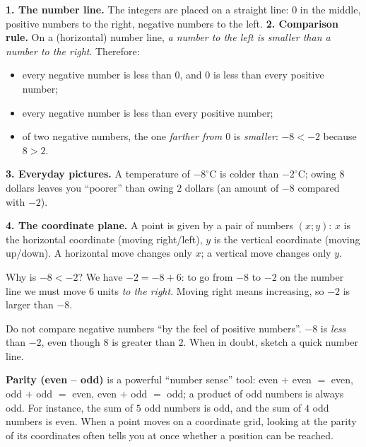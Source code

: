 \begin{knowbox}
\textbf{1. The number line.} The integers are placed on a straight line: $0$ in the middle, positive numbers to the
right, negative numbers to the left.
\textbf{2. Comparison rule.} On a (horizontal) number line, \emph{a number to the left is smaller than a number to the
right}. Therefore:
\begin{itemize}[leftmargin=1.4em,itemsep=1pt,topsep=2pt]
  \item every negative number is less than $0$, and $0$ is less than every positive number;
  \item every negative number is less than every positive number;
  \item of two negative numbers, the one \emph{farther from $0$} is \emph{smaller}: $-8 < -2$ because $8 > 2$.
\end{itemize}
\textbf{3. Everyday pictures.} A temperature of $-8^\circ$C is colder than $-2^\circ$C; owing $8$ dollars
leaves you ``poorer'' than owing $2$ dollars (an amount of $-8$ compared with $-2$).

\textbf{4. The coordinate plane.} A point is given by a pair of numbers $(x;y)$: $x$ is the horizontal coordinate
(moving right/left), $y$ is the vertical coordinate (moving up/down). A horizontal move changes only $x$; a vertical
move changes only $y$.
\end{knowbox}
\begin{proofbox}
Why is $-8 < -2$? We have $-2 = -8 + 6$: to go from $-8$ to $-2$ on the number line we must move $6$ units \emph{to the
right}. Moving right means increasing, so $-2$ is larger than $-8$.
\end{proofbox}
\begin{warnbox}
Do not compare negative numbers ``by the feel of positive numbers''. $-8$ is \emph{less} than $-2$, even though $8$ is
greater than $2$. When in doubt, sketch a quick number line.
\end{warnbox}
\begin{tipbox}
\textbf{Parity (even -- odd)} is a powerful ``number sense'' tool: even $+$ even $=$ even, odd $+$ odd $=$ even,
even $+$ odd $=$ odd; a product of odd numbers is always odd. For instance, the sum of $5$ odd numbers is odd, and the sum
of $4$ odd numbers is even. When a point moves on a coordinate grid, looking at the parity of its coordinates often tells
you at once whether a position can be reached.
\end{tipbox}

